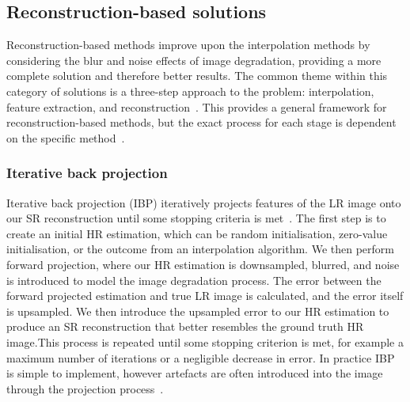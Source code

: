 \subsection{Reconstruction-based solutions}
Reconstruction-based methods improve upon the interpolation methods by considering the blur and noise effects of image degradation, providing a more complete solution and therefore better results. The common theme within this category of solutions is a three-step approach to the problem: interpolation, feature extraction, and reconstruction~\cite{superResRemoteSensingOverview}. This provides a general framework for reconstruction-based methods, but the exact process for each stage is dependent on the specific method~\cite{superResRemoteSensingOverview}.

\subsubsection{Iterative back projection}
Iterative back projection (IBP) iteratively projects features of the LR image onto our SR reconstruction until some stopping criteria is met~\cite{ibp}. The first step is to create an initial HR estimation, which can be random initialisation, zero-value initialisation, or the outcome from an interpolation algorithm. We then perform forward projection, where our HR estimation is downsampled, blurred, and noise is introduced to model the image degradation process. The error between the forward projected estimation and true LR image is calculated, and the error itself is upsampled. We then introduce the upsampled error to our HR estimation to produce an SR reconstruction that better resembles the ground truth HR image.\@ This process is repeated until some stopping criterion is met, for example a maximum number of iterations or a negligible decrease in error. In practice IBP is simple to implement, however artefacts are often introduced into the image through the projection process~\cite{ibp}.

